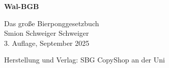 \documentclass[a5paper, 12pt]{book}
\begin{document}
\renewcommand{\listfigurename}{Abbildungs- verzeichnis}
\begin{titlepage}
\begin{center}
{\fontsize{40}{48}\selectfont \textbf{Wal-BGB}\par}

\begin{large}
\vspace{0.3cm}
Das große Bierponggesetzbuch\\
\vspace{1cm}
Smion Schweiger Schweiger\\
\vspace{1cm}
3. Auflage, September 2025
\end{large}
\end{center}
\vspace{6cm}
Herstellung und Verlag: SBG CopyShop an der Uni
\end{titlepage}
\end{document}
